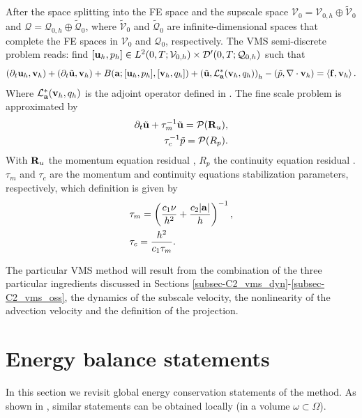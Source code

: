 After the space splitting into the FE space and the supscale space $\mathcal{V}_0=\mathcal{V}_{0,h}\oplus\widetilde{\mathcal{V}}_0$ and $\mathcal{Q}=\mathcal{Q}_{0,h}\oplus\widetilde{\mathcal{Q}}_0$, where $\widetilde{\mathcal{V}}_0$ and $\widetilde{\mathcal{Q}}_0$ are infinite-dimensional spaces that complete the FE spaces in $\mathcal{V}_0$ and $\mathcal{Q}_0$, respectively. The VMS semi-discrete problem reads: find $[{\bf u}_h,p_h]\in {L}^2(0,T;\mathcal{V}_{0,h})\times {\cal D}'(0,T;\mathcal{Q}_{0,h})$ such that
\begin{equation}
\label{eq-C4_NS_discrete}
(\partial_t{\bf u}_h,{\bf v}_h)+(\partial_t\tilde{{\bf u}},{\bf v}_h)+B({\bf a};[{\bf u}_h,p_h],[{\bf v}_h,q_h])+\left(\tilde{{\bf u}},\mathcal{L}_{{\bf a}}^*({\bf v}_h,q_h)\right)_h-\left(\tilde{p},\nabla\cdot{\bf v}_h\right)=\left<{\bf f},{\bf v}_h\right>.
\end{equation}
Where $ \mathcal{L}_{{\bf a}}^*({\bf v}_h,q_h) $ is the adjoint operator defined in . The fine scale problem is approximated by
\begin{align}
\label{eq-C4_velo_sgs}
\partial_t\tilde{{\bf u}}+\tau_m^{-1}\tilde{{\bf u}}=\mathcal{P}({\bf R}_u),\\
\label{eq-C4_press_sgs}
\tau_c^{-1}\tilde{p}=\mathcal{P}(R_p).
\end{align}
With $ {\bf R}_u $ the momentum equation residual , $ R_p $ the continuity equation residual . $ \tau_m $ and $ \tau_c $ are the momentum and continuity equations stabilization parameters, respectively, which definition is given by 
\begin{align}
\label{eq-C4_tau_m}
&\tau_m=\left(\frac{c_1\nu}{h^2}+\frac{c_2|{\bf a}|}{h}\right)^{-1},\\
\label{eq-C4_tau_c}
&\tau_c=\frac{h^2}{c_1\tau_m}.
\end{align}

The particular VMS method will result from the combination of the three particular ingredients discussed in Sections \ref{subsec-C2_vms_dyn}-\ref{subsec-C2_vms_oss}, the dynamics of the subscale velocity, the nonlinearity of the advection velocity and the definition of the projection.

\section{Energy balance statements}
\label{sec-C4_energy}

In this section we revisit global energy conservation statements of the method. As shown in \cite{Principe2009}, similar statements can be obtained locally (in a volume $\omega \subset \Omega$).

